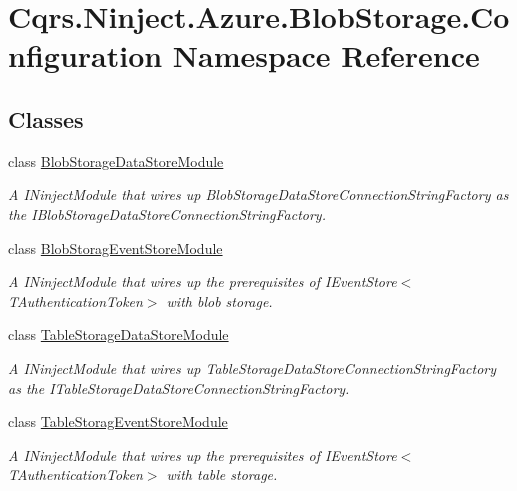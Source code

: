 \hypertarget{namespaceCqrs_1_1Ninject_1_1Azure_1_1BlobStorage_1_1Configuration}{}\section{Cqrs.\+Ninject.\+Azure.\+Blob\+Storage.\+Configuration Namespace Reference}
\label{namespaceCqrs_1_1Ninject_1_1Azure_1_1BlobStorage_1_1Configuration}
\subsection*{Classes}
\begin{DoxyCompactItemize}
\item 
class \hyperlink{classCqrs_1_1Ninject_1_1Azure_1_1BlobStorage_1_1Configuration_1_1BlobStorageDataStoreModule}{Blob\+Storage\+Data\+Store\+Module}
\begin{DoxyCompactList}\small\item\em A I\+Ninject\+Module that wires up Blob\+Storage\+Data\+Store\+Connection\+String\+Factory as the I\+Blob\+Storage\+Data\+Store\+Connection\+String\+Factory. \end{DoxyCompactList}\item 
class \hyperlink{classCqrs_1_1Ninject_1_1Azure_1_1BlobStorage_1_1Configuration_1_1BlobStoragEventStoreModule}{Blob\+Storag\+Event\+Store\+Module}
\begin{DoxyCompactList}\small\item\em A I\+Ninject\+Module that wires up the prerequisites of I\+Event\+Store$<$\+T\+Authentication\+Token$>$ with blob storage. \end{DoxyCompactList}\item 
class \hyperlink{classCqrs_1_1Ninject_1_1Azure_1_1BlobStorage_1_1Configuration_1_1TableStorageDataStoreModule}{Table\+Storage\+Data\+Store\+Module}
\begin{DoxyCompactList}\small\item\em A I\+Ninject\+Module that wires up Table\+Storage\+Data\+Store\+Connection\+String\+Factory as the I\+Table\+Storage\+Data\+Store\+Connection\+String\+Factory. \end{DoxyCompactList}\item 
class \hyperlink{classCqrs_1_1Ninject_1_1Azure_1_1BlobStorage_1_1Configuration_1_1TableStoragEventStoreModule}{Table\+Storag\+Event\+Store\+Module}
\begin{DoxyCompactList}\small\item\em A I\+Ninject\+Module that wires up the prerequisites of I\+Event\+Store$<$\+T\+Authentication\+Token$>$ with table storage. \end{DoxyCompactList}\end{DoxyCompactItemize}
